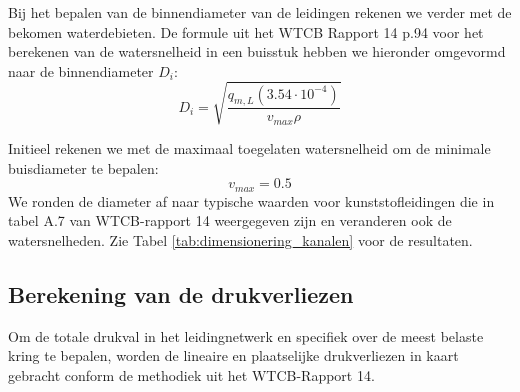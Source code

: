 \documentclass[a4paper,12pt]{article}
\begin{document}
Bij het bepalen van de binnendiameter van de leidingen rekenen we verder met de bekomen waterdebieten. De formule uit het WTCB Rapport 14 p.94 voor het berekenen van de watersnelheid in een buisstuk hebben we hieronder omgevormd naar de binnendiameter $D_{i}$:
\begin{equation}
    D_i=\sqrt{\frac{q_{m,L}\left(3.54 \cdot 10^{-4}\right)}{v_{max}\rho}}
\end{equation}

Initieel rekenen we met de maximaal toegelaten watersnelheid om de minimale buisdiameter te bepalen:
\begin{equation}
    {v_{max} = 0.5}
\end{equation} 
We ronden de diameter af naar typische waarden voor kunststofleidingen die in tabel A.7 van WTCB-rapport 14 weergegeven zijn en veranderen ook de watersnelheden. Zie Tabel \ref{tab:dimensionering_kanalen} voor de resultaten.

\begin{table}[!ht]
    \centering
    \caption{Overzicht van de buiskenmerken per kring.}
    \label{tab:buiskenmerken}
\end{table}

\subsection{Berekening van de drukverliezen}

Om de totale drukval in het leidingnetwerk en specifiek over de meest belaste kring te bepalen, worden de lineaire en plaatselijke drukverliezen in kaart gebracht conform de methodiek uit het WTCB-Rapport 14. 
\end{document}
